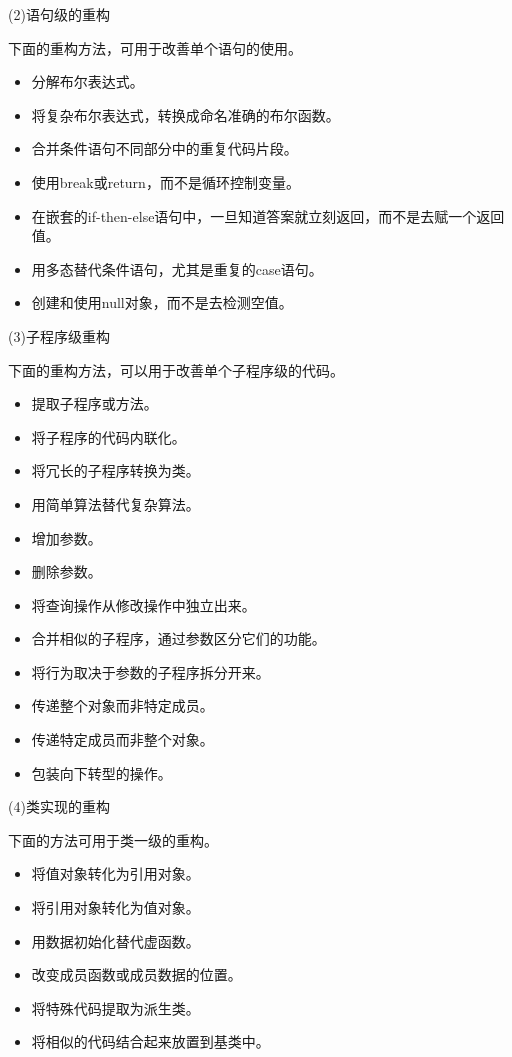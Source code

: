 \documentclass{article}
\begin{document}
\par
(2)语句级的重构
\par
下面的重构方法，可用于改善单个语句的使用。
\begin{itemize}
    \item 分解布尔表达式。
    \item 将复杂布尔表达式，转换成命名准确的布尔函数。
    \item 合并条件语句不同部分中的重复代码片段。
    \item 使用break或return，而不是循环控制变量。
    \item 在嵌套的if-then-else语句中，一旦知道答案就立刻返回，而不是去赋一个返回值。
    \item 用多态替代条件语句，尤其是重复的case语句。
    \item 创建和使用null对象，而不是去检测空值。
\end{itemize}

\par
(3)子程序级重构
\par
下面的重构方法，可以用于改善单个子程序级的代码。
\begin{itemize}
    \item 提取子程序或方法。
    \item 将子程序的代码内联化。
    \item 将冗长的子程序转换为类。
    \item 用简单算法替代复杂算法。
    \item 增加参数。
    \item 删除参数。
    \item 将查询操作从修改操作中独立出来。
    \item 合并相似的子程序，通过参数区分它们的功能。
    \item 将行为取决于参数的子程序拆分开来。
    \item 传递整个对象而非特定成员。
    \item 传递特定成员而非整个对象。
    \item 包装向下转型的操作。
\end{itemize}

\par
(4)类实现的重构
\par
下面的方法可用于类一级的重构。
\begin{itemize}
    \item 将值对象转化为引用对象。
    \item 将引用对象转化为值对象。
    \item 用数据初始化替代虚函数。
    \item 改变成员函数或成员数据的位置。
    \item 将特殊代码提取为派生类。
    \item 将相似的代码结合起来放置到基类中。
\end{itemize}
\end{document}
